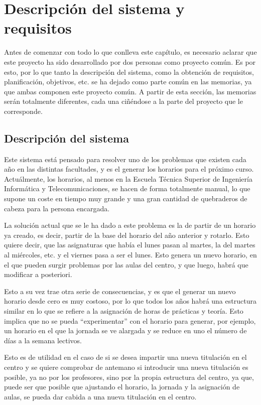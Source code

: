 \chapter{Descripción del sistema y requisitos}

Antes de comenzar con todo lo que conlleva este capítulo, es necesario aclarar que este proyecto ha sido desarrollado por dos personas como proyecto común. Es por esto, por lo que tanto la descripción del sistema, como la obtención de requisitos, planificación, objetivos, etc. se ha dejado como parte común en las memorias, ya que ambas componen este proyecto común. A partir de esta sección, las memorias serán totalmente diferentes, cada una ciñéndose a la parte del proyecto que le corresponde.

\section{Descripción del sistema}

Este sistema está pensado para resolver uno de los problemas que existen cada año en las distintas facultades, y es el generar los horarios para el próximo curso. Actuálmente, los horarios, al menos en la Escuela Técnica Superior de Ingeniería Informática y Telecomunicaciones, se hacen de forma totalmente manual, lo que supone un coste en tiempo muy grande y una gran cantidad de quebraderos de cabeza para la persona encargada. 

La solución actual que se le ha dado a este problema es la de partir de un horario ya creado, es decir, partir de la base del horario del año anterior y rotarlo. Esto quiere decir, que las asignaturas que había el lunes pasan al martes, la del martes al miércoles, etc. y el viernes pasa a ser el lunes. Esto genera un nuevo horario, en el que pueden surgir problemas por las aulas del centro, y que luego, habrá que modificar a posteriori.

Esto a su vez trae otra serie de consecuencias, y es que el generar un nuevo horario desde cero es muy costoso, por lo que todos los años habrá una estructura similar en lo que se refiere a la asignación de horas de prácticas y teoría. Esto implica que no se pueda ``experimentar'' con el horario para generar, por ejemplo, un horario en el que la jornada se ve alargada y se reduce en uno el número de días a la semana lectivos.

Esto es de utilidad en el caso de si se desea impartir una nueva titulación en el centro y se quiere comprobar de antemano si introducir una nueva titulación es posible, ya no por los profesores, sino por la propia estructura del centro, ya que, puede ser que posible que ajustando el horario, la jornada y la asignación de aulas, se pueda dar cabida a una nueva titulación en el centro.

